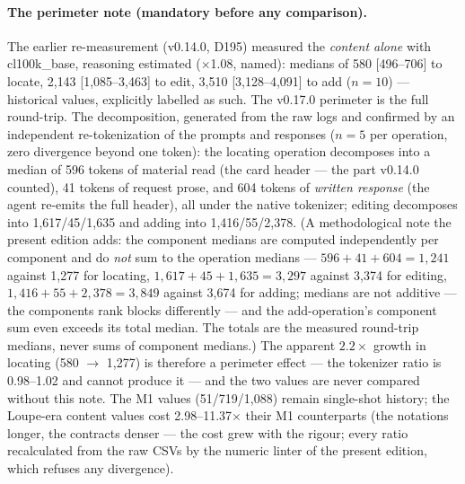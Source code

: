 \documentclass[10pt,a4paper]{article}
\begin{document}
\paragraph{The perimeter note (mandatory before any comparison).}
The earlier re-measurement (v0.14.0, D195) measured the \emph{content
alone} with cl100k\_base, reasoning estimated ($\times$1.08, named):
medians of 580 [496--706] to locate, 2{,}143 [1{,}085--3{,}463] to edit,
3{,}510 [3{,}128--4{,}091] to add ($n{=}10$) --- historical values,
explicitly labelled as such. The v0.17.0 perimeter is the full
round-trip. The decomposition, generated from the raw logs and
confirmed by an independent re-tokenization of the prompts and responses
($n{=}5$ per operation, zero divergence beyond one token): the locating
operation decomposes into a median of 596 tokens of material read (the
card header --- the part v0.14.0 counted), 41 tokens of request prose,
and 604 tokens of \emph{written response} (the agent re-emits the full
header), all under the native tokenizer; editing decomposes into
1{,}617/45/1{,}635 and adding into 1{,}416/55/2{,}378. (A
methodological note the present edition adds: the component medians are
computed independently per component and do \emph{not} sum to the
operation medians --- $596{+}41{+}604 = 1{,}241$ against 1{,}277 for
locating, $1{,}617{+}45{+}1{,}635 = 3{,}297$ against 3{,}374 for
editing, $1{,}416{+}55{+}2{,}378 = 3{,}849$ against 3{,}674 for adding;
medians are not additive --- the components rank blocks differently ---
and the add-operation's component sum even exceeds its total median.
The totals are the measured round-trip medians, never sums of component
medians.) The apparent
$2.2\times$ growth in locating (580 $\to$ 1{,}277) is therefore a
perimeter effect --- the tokenizer ratio is 0.98--1.02 and cannot
produce it --- and the two values are never compared without this note.
The M1 values (51/719/1{,}088) remain single-shot history; the
Loupe-era content values cost 2.98--11.37$\times$ their M1 counterparts
(the notations longer, the contracts denser --- the cost grew with the
rigour; every ratio recalculated from the raw CSVs by the numeric
linter of the present edition, which refuses any divergence).
\end{document}

